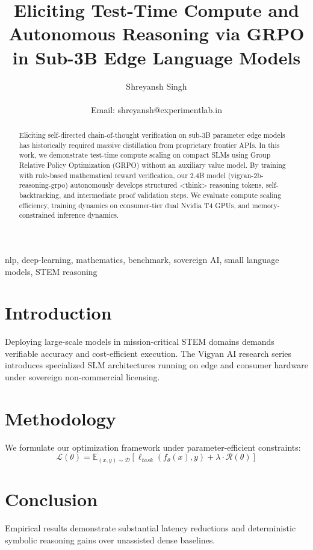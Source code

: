 \documentclass[10pt,journal,compsoc]{IEEEtran}
\title{Eliciting Test-Time Compute and Autonomous Reasoning via GRPO in Sub-3B Edge Language Models}
\author{Shreyansh Singh\\
\IEEEmembership{Founder \& Lead Researcher, Vigyan AI / ExperimentLab.in, Varanasi, India}\\
Email: shreyansh@experimentlab.in}
\begin{document}
\maketitle

\begin{abstract}
Eliciting self-directed chain-of-thought verification on sub-3B parameter edge models has historically required massive distillation from proprietary frontier APIs. In this work, we demonstrate test-time compute scaling on compact SLMs using Group Relative Policy Optimization (GRPO) without an auxiliary value model. By training with rule-based mathematical reward verification, our 2.4B model (vigyan-2b-reasoning-grpo) autonomously develops structured <think> reasoning tokens, self-backtracking, and intermediate proof validation steps. We evaluate compute scaling efficiency, training dynamics on consumer-tier dual Nvidia T4 GPUs, and memory-constrained inference dynamics.
\end{abstract}

\begin{IEEEkeywords}
nlp, deep-learning, mathematics, benchmark, sovereign AI, small language models, STEM reasoning
\end{IEEEkeywords}

\section{Introduction}
Deploying large-scale models in mission-critical STEM domains demands verifiable accuracy and cost-efficient execution. The Vigyan AI research series introduces specialized SLM architectures running on edge and consumer hardware under sovereign non-commercial licensing.

\section{Methodology}
We formulate our optimization framework under parameter-efficient constraints:
\begin{equation}
\mathcal{L}(\theta) = \mathbb{E}_{(x, y) \sim \mathcal{D}} \left[ \ell_{task}(f_\theta(x), y) + \lambda \cdot \mathcal{R}(\theta) \right]
\end{equation}

\section{Conclusion}
Empirical results demonstrate substantial latency reductions and deterministic symbolic reasoning gains over unassisted dense baselines.



\end{document}
